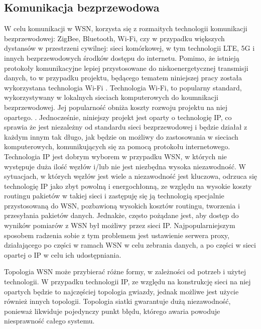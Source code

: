 \documentclass[12pt,oneside,a4paper]{book}
\theoremstyle{break}
\begin{document}
\subsection{Komunikacja bezprzewodowa}
W celu komunikacji w WSN, korzysta się z rozmaitych
technologii komunikacji bezprzewodowej: ZigBee, Bluetooth, Wi-Fi, czy
w przypadku większych dystansów w przestrzeni cywilnej: sieci
komórkowej, w tym technologii LTE, 5G
i innych bezprzewodowych środków dostępu do internetu.
\cite{agh-ieee-1451}
Pomimo, że istnieją protokoły komunikacyjne lepiej przystosowane
do niskoenergetycznej transmisji danych, to w przypadku
projektu, będącego tematem niniejszej pracy została wykorzystana
technologia Wi-Fi \cite{zigbee-intro}. 
Technologia Wi-Fi, to popularny standard, wykorzystywany
w lokalnych sieciach komputerowych do koumnikacji bezprzewodowej.
Jej popularność obniża koszty rozwoju projektu na niej opartego. 
\cite{wifi-popularity-history}.
Jednocześnie, niniejszy projekt jest oparty o technologię IP, co
sprawia że jest niezależny od standardu sieci bezprzewodowej i 
będzie działał z każdym innym tak długo, jak będzie on możliwy
do zastosowania w sieciach komputerowych, komunikujących się za
pomocą protokołu internetowego. \cite{networking}
Technologia IP jest dobrym wyborem w przypadku WSN, w których
nie występuje duża ilość węzłów i/lub nie jest niezbędna wysoka 
niezawodność. W sytuacjach, w których węzłów jest wiele a niezawodność
jest kluczowa, odrzuca się technologię IP jako zbyt powolną i energochłonną,
ze względu
na wysokie koszty routingu pakietów w takiej sieci i zastępuję się ją 
technologią specjalnie  przystosowaną do WSN, pozbawioną wysokich kosztów
routingu, tworzenia i przesyłania pakietów danych. Jednakże, często 
pożądane jest, aby dostęp do wyników pomiarów z WSN był możliwy przez
sieci IP. Najpopularniejszym sposobem radzenia sobie z tym problemem
jest ustawienie serwera proxy, działającego po części w ramach WSN w
celu zebrania danych, 
a po części w sieci opartej o IP w celu ich udostępniania.
\cite{ip-w-wsn} 
\cite{ip-i-wsn}
\par Topologia WSN może przybierać różne formy, w zależności od 
potrzeb i użytej technologii. W przypadku technologii IP, ze względu
na konstrukcję sieci na niej opartych będzie to najczęściej topologia 
gwiazdy, jednak możliwe jest użycie również innych topologii. 
Topologia
siatki gwarantuje dużą niezawodność, ponieważ likwiduje pojedynczy 
punkt błędu, którego awaria powoduje niesprawność całego systemu.
\cite{wsn-topologies}
\end{document}

